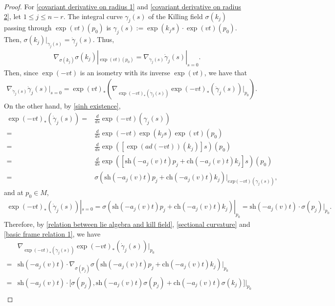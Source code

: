 \documentclass[12pt]{amsart}
\begin{document}
\begin{proof}
    For \eqref{covariant derivative on radius 1} and \eqref{covariant derivative on radius 2}, let $1 \leq j \leq n - r$. The integral curve $\gamma_j(s)$ of the Killing field $\sigma(k_j)$ passing through $\exp(vt)(p_0)$ is $\gamma_j(s) := \exp(k_js)\cdot \exp(vt)(p_0)$. Then, $\sigma(k_j)|_{\gamma_j(s)} = \dot\gamma_j(s)$. Thus, 
    \begin{align*}
        \nabla_{\sigma(k_j)}\sigma(k_j)|_{\exp(vt)(p_0)} = \nabla_{\dot\gamma_j(s)}\dot\gamma_j(s)|_{s = 0}.
    \end{align*}
    Then, since $\exp(-vt)$ is an isometry with its inverse $\exp(vt)$, we have that 
    \begin{align*}
        \nabla_{\dot\gamma_j(s)}\dot\gamma_j(s)|_{s = 0} = \exp(vt)_* (\nabla_{\exp(-vt)_*(\dot\gamma_j(s))}\exp(-vt)_*(\dot\gamma_j(s))|_{p_0}).
    \end{align*}
    On the other hand, by \eqref{sinh existence},
    \begin{align*}
        \exp(-vt)_*(\dot\gamma_j(s)) 
        =& \frac{d}{ds}\exp(-vt)(\gamma_j(s))\\
        =& \frac{d}{ds}\exp(-vt)\exp(k_j s)\exp(vt)(p_0)\\
        =& \frac{d}{ds} \exp([\exp(ad(-vt))(k_j)]s)(p_0)\\
        =& \frac{d}{ds} \exp([\mathrm{sh}(-a_j(v)t)p_j + \mathrm{ch}(-a_j(v)t)k_j]s)(p_0)\\
        =& \sigma(\mathrm{sh}(-a_j(v)t)p_j + \mathrm{ch}(-a_j(v)t)k_j)|_{exp(-vt)(\gamma_j(s))},
    \end{align*}
    and at $p_0 \in M$, 
    \begin{align*}
        \exp(-vt)_*(\dot\gamma_j(s))|_{s = 0} = \sigma(\mathrm{sh}(-a_j(v)t)p_j + \mathrm{ch}(-a_j(v)t)k_j)|_{p_0} = \mathrm{sh}(-a_j(v)t)\cdot\sigma(p_j)|_{p_0}.
    \end{align*}
    Therefore, by \eqref{relation between lie algebra and kill field}, \eqref{sectional curvature} and \eqref{basic frame relation 1}, we have  
    \begin{align*}
        &\nabla_{\exp(-vt)_*(\dot\gamma_j(s))}\exp(-vt)_*(\dot\gamma_j(s))|_{p_0}\\
        =& \mathrm{sh}(-a_j(v)t)\cdot\nabla_{\sigma(p_j)}\sigma(\mathrm{sh}(-a_j(v)t)p_j + \mathrm{ch}(-a_j(v)t)k_j)|_{p_0}\\
        =& \mathrm{sh}(-a_j(v)t)\cdot\Big[\sigma(p_j), \mathrm{sh}(-a_j(v)t)\sigma(p_j) + \mathrm{ch}(-a_j(v)t)\sigma(k_j)\Big]\Big|_{p_0}\\

\end{align*}
\end{proof}
\end{document}
